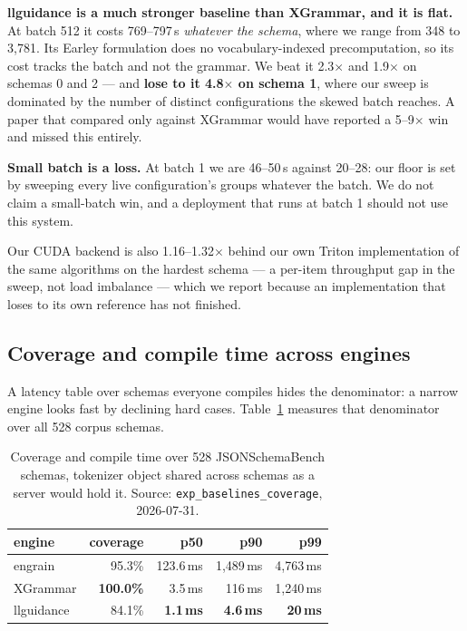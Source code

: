 \documentclass{article}
\begin{document}
\textbf{llguidance is a much stronger baseline than XGrammar, and it is flat.}
At batch 512 it costs 769--797\,\textmu{}s \emph{whatever the schema}, where we
range from 348 to 3{,}781. Its Earley formulation does no vocabulary-indexed
precomputation, so its cost tracks the batch and not the grammar. We beat it
2.3$\times$ and 1.9$\times$ on schemas 0 and 2 --- and \textbf{lose to it
4.8$\times$ on schema 1}, where our sweep is dominated by the number of
distinct configurations the skewed batch reaches. A paper that compared only
against XGrammar would have reported a 5--9$\times$ win and missed this
entirely.

\textbf{Small batch is a loss.} At batch 1 we are 46--50\,\textmu{}s against
20--28: our floor is set by sweeping every live configuration's groups whatever
the batch. We do not claim a small-batch win, and a deployment that runs at
batch 1 should not use this system.

Our CUDA backend is also 1.16--1.32$\times$ behind our own Triton
implementation of the same algorithms on the hardest schema --- a per-item
throughput gap in the sweep, not load imbalance --- which we report because an
implementation that loses to its own reference has not finished.

\subsection{Coverage and compile time across engines}
\label{sec:eval-coverage}

A latency table over schemas everyone compiles hides the denominator: a narrow
engine looks fast by declining hard cases. Table~\ref{tab:coverage} measures
that denominator over all 528 corpus schemas.

\begin{table}[t]
\caption{Coverage and compile time over 528 JSONSchemaBench schemas, tokenizer
object shared across schemas as a server would hold it.
Source: \texttt{exp\_baselines\_coverage}, 2026-07-31.}
\label{tab:coverage}
\vskip 0.1in
\begin{center}
\begin{small}
\begin{tabular}{lrrrr}
\toprule
engine & coverage & p50 & p90 & p99 \\
\midrule
engrain    & 95.3\% & 123.6\,ms & 1{,}489\,ms & 4{,}763\,ms \\
XGrammar   & \textbf{100.0\%} & 3.5\,ms & 116\,ms & 1{,}240\,ms \\
llguidance & 84.1\% & \textbf{1.1\,ms} & \textbf{4.6\,ms} & \textbf{20\,ms} \\
\bottomrule
\end{tabular}
\end{small}
\end{center}
\vskip -0.1in
\end{table}
\end{document}
